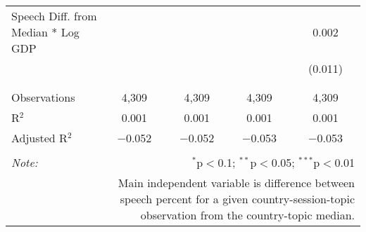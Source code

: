 \begin{table}[!htbp]
\begin{tabular}{@{\extracolsep{5pt}}lcccc}
 Speech Diff. from Median * Log GDP &  &  &  & 0.002 \\ 
  &  &  &  & (0.011) \\ 
  & & & & \\ 
\hline \\[-1.8ex] 
Observations & 4,309 & 4,309 & 4,309 & 4,309 \\ 
R$^{2}$ & 0.001 & 0.001 & 0.001 & 0.001 \\ 
Adjusted R$^{2}$ & $-$0.052 & $-$0.052 & $-$0.053 & $-$0.053 \\ 
\hline 
\hline \\[-1.8ex] 
\textit{Note:}  & \multicolumn{4}{r}{$^{*}$p$<$0.1; $^{**}$p$<$0.05; $^{***}$p$<$0.01} \\ 
 & \multicolumn{4}{r}{Main independent variable is difference between speech percent for a given country-session-topic observation from the country-topic median.} \\ 
\end{tabular} 
\end{table} 
